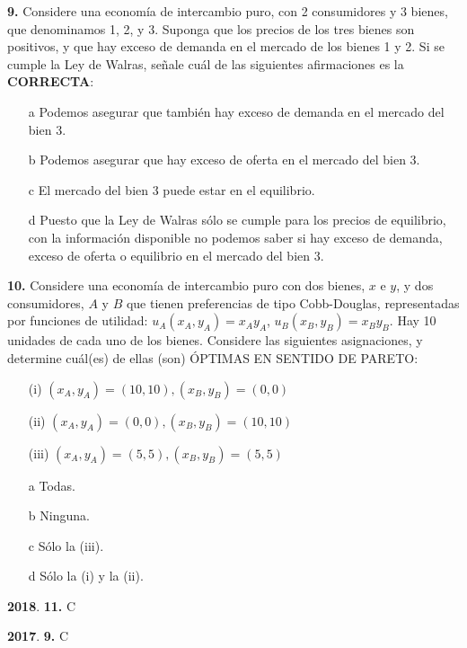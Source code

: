 \documentclass{nuevotema}
\begin{document}
\textbf{9.} Considere una economía de intercambio puro, con 2 consumidores y 3 bienes, que denominamos 1, 2, y 3. Suponga que los precios de los tres bienes son positivos, y que hay exceso de demanda en el mercado de los bienes 1 y 2. Si se cumple la Ley de Walras, señale cuál de las siguientes afirmaciones es la \textbf{CORRECTA}:

\begin{itemize}
	\item[a] Podemos asegurar que también hay exceso de demanda en el mercado del bien 3.
	\item[b] Podemos asegurar que hay exceso de oferta en el mercado del bien 3.
	\item[c] El mercado del bien 3 puede estar en el equilibrio.
	\item[d] Puesto que la Ley de Walras sólo se cumple para los precios de equilibrio, con la información disponible no podemos saber si hay exceso de demanda, exceso de oferta o equilibrio en el mercado del bien 3.
\end{itemize}

\textbf{10.} Considere una economía de intercambio puro con dos bienes, $x$ e $y$, y dos consumidores, $A$ y $B$ que tienen preferencias de tipo Cobb-Douglas, representadas por funciones de utilidad: $u_A (x_A, y_A) = x_A y_A$, $u_B(x_B, y_B) = x_B y_B$. Hay 10 unidades de cada uno de los bienes. Considere las siguientes asignaciones, y determine cuál(es) de ellas (son) ÓPTIMAS EN SENTIDO DE PARETO:

\begin{itemize}
	\item[(i)] $(x_A, y_A)  = (10,10), (x_B, y_B) = (0,0)$
	\item[(ii)] $(x_A, y_A) = (0,0), (x_B, y_B) = (10,10)$
	\item[(iii)] $(x_A, y_A) = (5,5), (x_B, y_B) = (5,5)$
\end{itemize}

\begin{itemize}
	\item[a] Todas.
	\item[b] Ninguna. 
	\item[c] Sólo la (iii).
	\item[d] Sólo la (i) y la (ii).
\end{itemize}

\notas

\textbf{2018}. \textbf{11.} C

\textbf{2017}. \textbf{9.} C
\end{document}
